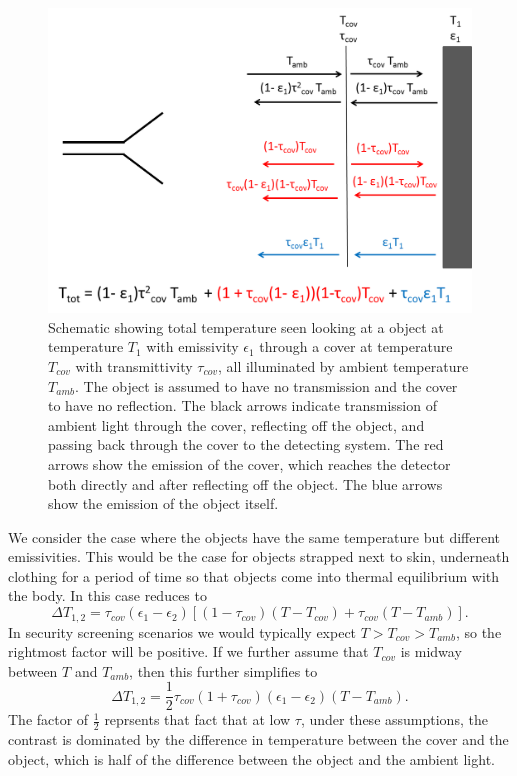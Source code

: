 \begin{figure}
\centering
\includegraphics[width=6in]{images/ch1-t-tot.png}
\caption[xxx]{
  Schematic showing total temperature seen looking at a object at temperature $T_1$ with emissivity $\epsilon_1$ through a cover at temperature $T_{cov}$ with transmittivity $\tau_{cov}$, all illuminated by ambient temperature $T_{amb}$.
  The object is assumed to have no transmission and the cover to have no reflection.
  The black arrows indicate transmission of ambient light through the cover, reflecting off the object, and passing back through the cover to the detecting system.
  The red arrows show the emission of the cover, which reaches the detector both directly and after reflecting off the object.
  The blue arrows show the emission of the object itself.
}
\label{fig:ch1-t-tot}
\end{figure}

We consider the case where the objects have the same temperature but different emissivities.
This would be the case for objects strapped next to skin, underneath clothing for a period of time so that objects come into thermal equilibrium with the body.
In this case  reduces to
\begin{equation}
  \Delta T_{1,2} = \tau_{cov} (\epsilon_1 - \epsilon_2) \left[ (1 - \tau_{cov}) (T - T_{cov}) + \tau_{cov} (T - T_{amb}) \right].
\end{equation}
In security screening scenarios we would typically expect $T > T_{cov} > T_{amb}$, so the rightmost factor will be positive.
If we further assume that $T_{cov}$ is midway between $T$ and $T_{amb}$, then this further simplifies to
\begin{equation} \label{eqn:ch1-delta-t-simple}
  \Delta T_{1,2} = \frac{1}{2}\tau_{cov}(1+\tau_{cov}) (\epsilon_1 - \epsilon_2) (T - T_{amb}).
\end{equation}
The factor of $\frac{1}{2}$ reprsents that fact that at low $\tau$, under these assumptions, the contrast is dominated by the difference in temperature between the cover and the object, which is half of the difference between the object and the ambient light.

